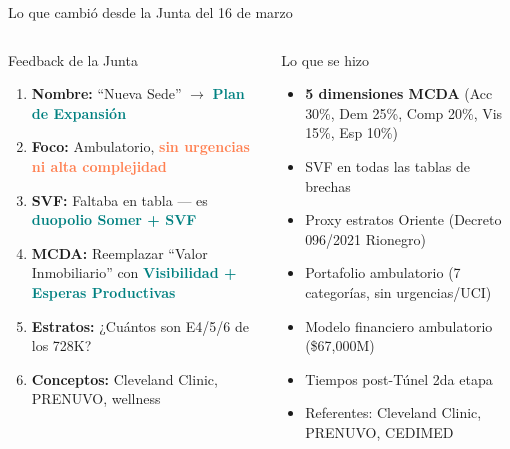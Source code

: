\documentclass[aspectratio=169, 11pt]{beamer}
\newcommand{\highlight}[1]{\textcolor{teal}{\textbf{#1}}}
\newcommand{\danger}[1]{\textcolor{coral}{\textbf{#1}}}
\begin{document}
\begin{frame}{Lo que cambió desde la Junta del 16 de marzo}
\begin{columns}[T]
\begin{alertblock}{\small Feedback de la Junta}
\footnotesize
\begin{enumerate}\setlength{\itemsep}{2pt}
  \item \textbf{Nombre:} ``Nueva Sede'' $\to$ \highlight{Plan de Expansión}
  \item \textbf{Foco:} Ambulatorio, \danger{sin urgencias ni alta complejidad}
  \item \textbf{SVF:} Faltaba en tabla --- es \highlight{duopolio Somer + SVF}
  \item \textbf{MCDA:} Reemplazar ``Valor Inmobiliario'' con \highlight{Visibilidad + Esperas Productivas}
  \item \textbf{Estratos:} ¿Cuántos son E4/5/6 de los 728K?
  \item \textbf{Conceptos:} Cleveland Clinic, PRENUVO, wellness
\end{enumerate}
\end{alertblock}

\begin{exampleblock}{\small Lo que se hizo}
\footnotesize
\begin{itemize}\setlength{\itemsep}{2pt}
  \item[$\checkmark$] \textbf{5 dimensiones MCDA} (Acc 30\%, Dem 25\%, Comp 20\%, Vis 15\%, Esp 10\%)
  \item[$\checkmark$] SVF en todas las tablas de brechas
  \item[$\checkmark$] Proxy estratos Oriente (Decreto 096/2021 Rionegro)
  \item[$\checkmark$] Portafolio ambulatorio (7 categorías, sin urgencias/UCI)
  \item[$\checkmark$] Modelo financiero ambulatorio (\$67,000M)
  \item[$\checkmark$] Tiempos post-Túnel 2da etapa
  \item[$\checkmark$] Referentes: Cleveland Clinic, PRENUVO, CEDIMED
\end{itemize}
\end{exampleblock}
\end{columns}
\end{frame}
\end{document}
